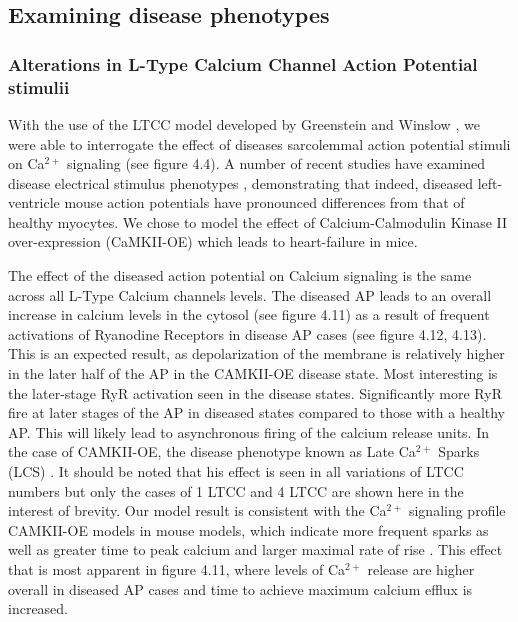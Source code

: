 \documentclass[12pt]{ucsddissertation}
\begin{document}
\subsection{Examining disease phenotypes}
\subsubsection{Alterations in L-Type Calcium Channel Action Potential stimulii}
With the use of the LTCC model developed by Greenstein and Winslow \cite{Greenstein2002}, we were able to interrogate the effect of diseases sarcolemmal action potential stimuli on Ca$^{2+}$ signaling (see figure 4.4). A number of recent studies have examined disease electrical stimulus phenotypes \cite{Morotti2014, Edwards2014}, demonstrating that indeed, diseased left-ventricle mouse action potentials have pronounced differences from that of healthy myocytes. We chose to model the effect of Calcium-Calmodulin Kinase II over-expression (CaMKII-OE) which leads to heart-failure in mice.

The effect of the diseased action potential on Calcium signaling is the same across all L-Type Calcium channels levels. The diseased AP leads to an overall increase in calcium levels in the cytosol (see figure 4.11) as a result of frequent activations of Ryanodine Receptors in disease AP cases (see figure 4.12, 4.13). This is an expected result, as depolarization of the membrane is relatively higher in the later half of the AP in the CAMKII-OE disease state. Most interesting is the later-stage RyR activation seen in the disease states. Significantly more RyR fire at later stages of the AP in diseased states compared to those with a healthy AP. This will likely lead to asynchronous firing of the calcium release units. In the case of CAMKII-OE, the disease phenotype known as Late Ca$^{2+}$ Sparks (LCS) \cite{Fowler2017}. It should be noted that his effect is seen in all variations of LTCC numbers but only the cases of 1 LTCC and 4 LTCC are shown here in the interest of brevity. Our model result is consistent with the Ca$^{2+}$ signaling profile CAMKII-OE models in mouse models, which indicate more frequent sparks as well as greater time to peak calcium and larger maximal rate of rise \cite{Guo2012a}. This effect that is most apparent in figure 4.11, where levels of Ca$^{2+}$ release are higher overall in diseased AP cases and time to achieve maximum calcium efflux is increased. 
\end{document}
